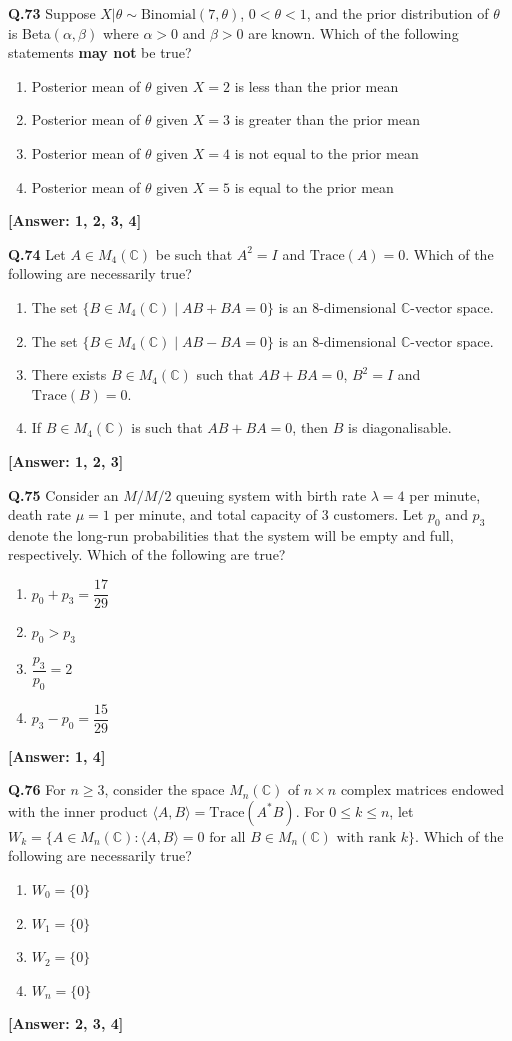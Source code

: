 \documentclass[12pt,a4paper]{article}
\newcommand{\ans}[1]{\quad\textcolor{anscolor}{\textbf{[Answer: #1]}}}
\begin{document}
\textbf{Q.73} Suppose $X|\theta\sim\text{Binomial}(7,\theta)$, $0<\theta<1$, and the prior distribution of $\theta$ is Beta$(\alpha,\beta)$ where $\alpha>0$ and $\beta>0$ are known. Which of the following statements \textbf{may not} be true?
\begin{enumerate}[label=\arabic*.]
\item Posterior mean of $\theta$ given $X=2$ is less than the prior mean
\item Posterior mean of $\theta$ given $X=3$ is greater than the prior mean
\item Posterior mean of $\theta$ given $X=4$ is not equal to the prior mean
\item Posterior mean of $\theta$ given $X=5$ is equal to the prior mean
\end{enumerate}\ans{1, 2, 3, 4}

\textbf{Q.74} Let $A\in M_4(\mathbb{C})$ be such that $A^2=I$ and $\text{Trace}(A)=0$. Which of the following are necessarily true?
\begin{enumerate}[label=\arabic*.]
\item The set $\{B\in M_4(\mathbb{C})\mid AB+BA=0\}$ is an 8-dimensional $\mathbb{C}$-vector space.
\item The set $\{B\in M_4(\mathbb{C})\mid AB-BA=0\}$ is an 8-dimensional $\mathbb{C}$-vector space.
\item There exists $B\in M_4(\mathbb{C})$ such that $AB+BA=0$, $B^2=I$ and $\text{Trace}(B)=0$.
\item If $B\in M_4(\mathbb{C})$ is such that $AB+BA=0$, then $B$ is diagonalisable.
\end{enumerate}\ans{1, 2, 3}

\textbf{Q.75} Consider an $M/M/2$ queuing system with birth rate $\lambda=4$ per minute, death rate $\mu=1$ per minute, and total capacity of 3 customers. Let $p_0$ and $p_3$ denote the long-run probabilities that the system will be empty and full, respectively. Which of the following are true?
\begin{enumerate}[label=\arabic*.]
\item $p_0+p_3=\dfrac{17}{29}$ \item $p_0>p_3$ \item $\dfrac{p_3}{p_0}=2$ \item $p_3-p_0=\dfrac{15}{29}$
\end{enumerate}\ans{1, 4}

\textbf{Q.76} For $n\ge3$, consider the space $M_n(\mathbb{C})$ of $n\times n$ complex matrices endowed with the inner product $\langle A,B\rangle=\text{Trace}(A^*B)$. For $0\le k\le n$, let $W_k=\{A\in M_n(\mathbb{C}):\langle A,B\rangle=0\text{ for all }B\in M_n(\mathbb{C})\text{ with rank }k\}$. Which of the following are necessarily true?
\begin{enumerate}[label=\arabic*.]
\item $W_0=\{0\}$ \item $W_1=\{0\}$ \item $W_2=\{0\}$ \item $W_n=\{0\}$
\end{enumerate}\ans{2, 3, 4}
\end{document}
